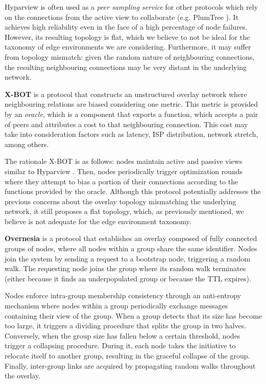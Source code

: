 Hyparview is often used as a \textit{peer sampling service} for other protocols which rely on the connections from the active view to collaborate (e.g. PlumTree \cite{plumTree}). It achieves high reliability even in the face of a high percentage of node failures. However, its resulting topology is flat, which we believe to not be ideal for the taxonomy of edge environments we are considering. Furthermore, it may suffer from topology mismatch: given the random nature of neighbouring connections, the resulting neighbouring connections may be very distant in the underlying network.

\textbf{X-BOT} \cite{x-bot} is a protocol that constructs an unstructured overlay network where neighbouring relations are biased considering one metric. This metric is provided by an \textit{oracle}, which is a component that exports a function, which accepts a pair of peers and attributes a cost to that neighbouring connection. This cost may take into consideration factors such as latency, ISP distribution, network stretch, among others. 

The rationale X-BOT is as follows: nodes maintain active and passive views similar to Hyparview \cite{Hyparview}. Then, nodes periodically trigger optimization rounds where they attempt to bias a portion of their connections according to the functions provided by the oracle. Although this protocol potentially addresses the previous concerns about the overlay topology mismatching the underlying network, it still proposes a flat topology, which, as previously mentioned, we believe is not adequate for the edge environment taxonomy. 

\textbf{Overnesia} \cite{leitao2014overnesia} is a protocol that establishes an overlay composed of fully connected groups of nodes, where all nodes within a group share the same identifier. Nodes join the system by sending a request to a bootstrap node, triggering a random walk. The requesting node joins the group where its random walk terminates (either because it finds an underpopulated group or because the TTL expires). 

Nodes enforce intra-group membership consistency through an anti-entropy mechanism where nodes within a group periodically exchange messages containing their view of the group. When a group detects that its size has become too large, it triggers a dividing procedure that splits the group in two halves. Conversely, when the group size has fallen below a certain threshold, nodes trigger a collapsing procedure. During it, each node takes the initiative to relocate itself to another group, resulting in the graceful collapse of the group. Finally, inter-group links are acquired by propagating random walks throughout the overlay.

